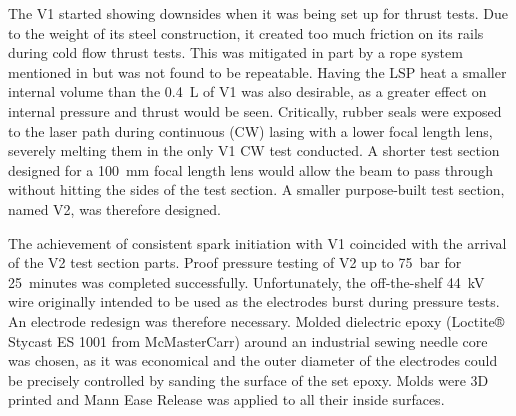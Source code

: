 The V1 started showing downsides when it was being set up for thrust tests. Due to the weight of its steel construction, it created too much friction on its rails during cold flow thrust tests. This was mitigated in part by a rope system mentioned in \textcite{duplayArgonLaserPlasmaThruster2024a} but was not found to be repeatable. Having the LSP heat a smaller internal volume than the \qty{0.4}{L} of V1 was also desirable, as a greater effect on internal pressure and thrust would be seen. Critically, rubber seals were exposed to the laser path during continuous (CW) lasing with a lower focal length lens, severely melting them in the only V1 CW test conducted. A shorter test section designed for a \qty{100}{mm} focal length lens would allow the beam to pass through without hitting the sides of the test section. A smaller purpose-built test section, named V2, was therefore designed.

The achievement of consistent spark initiation with V1 coincided with the arrival of the V2 test section parts. Proof pressure testing of V2 up to \qty{75}{bar} for \qty{25}{minutes} was completed successfully. Unfortunately, the off-the-shelf \qty{44}{kV} wire originally intended to be used as the electrodes burst during pressure tests. An electrode redesign was therefore necessary. Molded dielectric epoxy (Loctite® Stycast ES 1001 from McMasterCarr) around an industrial sewing needle core was chosen, as it was economical and the outer diameter of the electrodes could be precisely controlled by sanding the surface of the set epoxy. Molds were 3D printed and Mann Ease Release was applied to all their inside surfaces.

